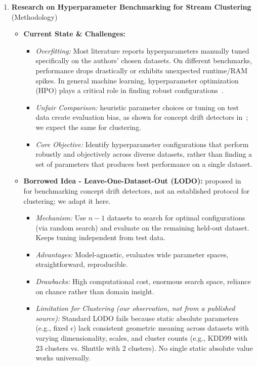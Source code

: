 \begin{enumerate}[label=\textbf{C\arabic*.},leftmargin=2.2em]
  \item \textbf{Research on Hyperparameter Benchmarking for Stream Clustering} \hfill{\small(Methodology)}\\
  \begin{itemize}[leftmargin=1.2em,itemsep=2pt,topsep=1pt]
    \item \textbf{Current State \& Challenges:}
    \begin{itemize}[leftmargin=1.2em,itemsep=1pt]
      \item \emph{Overfitting:} Most literature reports hyperparameters manually tuned specifically on the authors' chosen datasets. On different benchmarks, performance drops drastically or exhibits unexpected runtime/RAM spikes. In general machine learning, hyperparameter optimization (HPO) plays a critical role in finding robust configurations~\cite{franceschi2024hyperparameter}.
      \item \emph{Unfair Comparison:} heuristic parameter choices or tuning on test data create evaluation bias, as shown for concept drift detectors in~\cite{cerqueira2026framework}; we expect the same for clustering.
      \item \emph{Core Objective:} Identify hyperparameter configurations that perform robustly and objectively across diverse datasets, rather than finding a set of parameters that produces best performance on a single dataset.
    \end{itemize}

    \item \textbf{Borrowed Idea - Leave-One-Dataset-Out (LODO):} proposed in~\cite{cerqueira2026framework} for benchmarking concept drift detectors, not an established protocol for clustering; we adapt it here.
    \begin{itemize}[leftmargin=1.2em,itemsep=1pt]
      \item \emph{Mechanism:} Use $n-1$ datasets to search for optimal configurations (via random search) and evaluate on the remaining held-out dataset. Keeps tuning independent from test data.
      \item \emph{Advantages:} Model-agnostic, evaluates wide parameter spaces, straightforward, reproducible.
      \item \emph{Drawbacks:} High computational cost, enormous search space, reliance on chance rather than domain insight.
      \item \emph{Limitation for Clustering (our observation, not from a published source):} Standard LODO fails because static absolute parameters (e.g., fixed $\epsilon$) lack consistent geometric meaning across datasets with varying dimensionality, scales, and cluster counts (e.g., KDD99 with 23 clusters vs. Shuttle with 2 clusters). No single static absolute value works universally.
    \end{itemize}


\end{itemize}
\end{enumerate}
